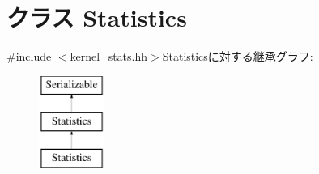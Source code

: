 \hypertarget{classAlphaISA_1_1Kernel_1_1Statistics}{
\section{クラス Statistics}
\label{classAlphaISA_1_1Kernel_1_1Statistics}
}


{\ttfamily \#include $<$kernel\_\-stats.hh$>$}Statisticsに対する継承グラフ:\begin{figure}[H]
\begin{center}
\leavevmode
\includegraphics[height=3cm]{classAlphaISA_1_1Kernel_1_1Statistics}
\end{center}
\end{figure}
